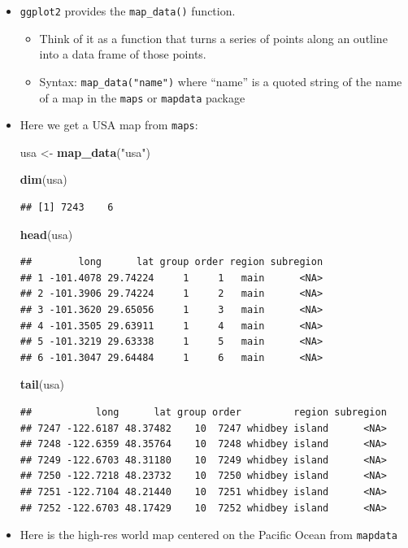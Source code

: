 \documentclass[]{book}
\newenvironment{Shaded}{\begin{snugshade}}{\end{snugshade}}
\newcommand{\KeywordTok}[1]{\textcolor[rgb]{0.13,0.29,0.53}{\textbf{{#1}}}}
\newcommand{\StringTok}[1]{\textcolor[rgb]{0.31,0.60,0.02}{{#1}}}
\newcommand{\NormalTok}[1]{{#1}}
\providecommand{\tightlist}{%
  \setlength{\itemsep}{0pt}\setlength{\parskip}{0pt}}
\theoremstyle{definition}
\theoremstyle{definition}
\theoremstyle{remark}
\begin{document}
\begin{itemize}
\item
  \texttt{ggplot2} provides the \texttt{map\_data()} function.

  \begin{itemize}
  \tightlist
  \item
    Think of it as a function that turns a series of points along an
    outline into a data frame of those points.
  \item
    Syntax: \texttt{map\_data("name")} where ``name'' is a quoted string
    of the name of a map in the \texttt{maps} or \texttt{mapdata}
    package
  \end{itemize}
\item
  Here we get a USA map from \texttt{maps}:

\begin{Shaded}
\begin{Highlighting}[]
\NormalTok{usa <-}\StringTok{ }\KeywordTok{map_data}\NormalTok{(}\StringTok{"usa"}\NormalTok{)}

\KeywordTok{dim}\NormalTok{(usa)}
\end{Highlighting}
\end{Shaded}

\begin{verbatim}
## [1] 7243    6
\end{verbatim}

\begin{Shaded}
\begin{Highlighting}[]
\KeywordTok{head}\NormalTok{(usa)}
\end{Highlighting}
\end{Shaded}

\begin{verbatim}
##        long      lat group order region subregion
## 1 -101.4078 29.74224     1     1   main      <NA>
## 2 -101.3906 29.74224     1     2   main      <NA>
## 3 -101.3620 29.65056     1     3   main      <NA>
## 4 -101.3505 29.63911     1     4   main      <NA>
## 5 -101.3219 29.63338     1     5   main      <NA>
## 6 -101.3047 29.64484     1     6   main      <NA>
\end{verbatim}

\begin{Shaded}
\begin{Highlighting}[]
\KeywordTok{tail}\NormalTok{(usa)}
\end{Highlighting}
\end{Shaded}

\begin{verbatim}
##           long      lat group order         region subregion
## 7247 -122.6187 48.37482    10  7247 whidbey island      <NA>
## 7248 -122.6359 48.35764    10  7248 whidbey island      <NA>
## 7249 -122.6703 48.31180    10  7249 whidbey island      <NA>
## 7250 -122.7218 48.23732    10  7250 whidbey island      <NA>
## 7251 -122.7104 48.21440    10  7251 whidbey island      <NA>
## 7252 -122.6703 48.17429    10  7252 whidbey island      <NA>
\end{verbatim}
\item
  Here is the high-res world map centered on the Pacific Ocean from
  \texttt{mapdata}


\end{itemize}
\end{document}
